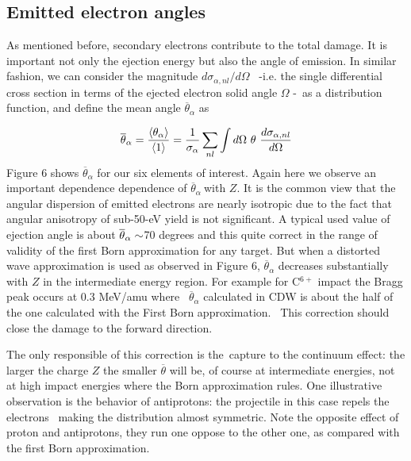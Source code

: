\documentclass[preprint,showpacs,pra]{revtex4-1}
\begin{document}
\subsection{Emitted electron angles}

As mentioned before, secondary electrons contribute to the total damage. It
is important not only the ejection energy but also the angle of emission. In
similar fashion, we can consider the magnitude $d\sigma _{\alpha
,nl}/d\Omega $ \ -i.e. the single differential cross section in terms of the
ejected electron solid angle $\Omega $ -\ as a distribution function, and
define the mean angle $\overline{\theta }_{\alpha }$ as

\begin{equation}
\overline{\theta }_{\alpha }=\frac{\langle \theta _{\alpha }\rangle }{%
\langle 1\rangle }=\frac{1}{\sigma _{\alpha }}\sum\limits_{nl}\int d\Omega
\ \theta \ \frac{d\sigma _{\alpha ,nl}}{d\Omega }
\end{equation}%
Figure 6 shows $\overline{\theta }_{\alpha }$ for our six elements of
interest. Again here we observe an important dependence dependence of $%
\overline{\theta }_{\alpha }\ $with $Z.$ It is the common view 
\cite{Rudd1992} that the angular dispersion of emitted electrons are nearly
isotropic due to the fact that angular anisotropy of sub-50-eV yield is not
significant. A typical used value of ejection angle is about $\overline{%
\theta }_{\alpha }\sim $70 degrees \cite{surdutovic2018} and this quite
correct in the range of validity of the first Born approximation for any
target. But when a distorted wave approximation is used as observed in
Figure 6, $\overline{\theta }_{\alpha }$ decreases substantially with $Z$ in
the intermediate energy region. For example for C$^{6+}$ impact the Bragg
peak occurs at 0.3 MeV/amu where \ $\overline{\theta }_{\alpha }$ calculated
in CDW is about the half of the one calculated with the First Born
approximation. \ This correction should close the damage to the forward
direction.

The only responsible of this correction is the\ capture to the continuum
effect: the larger the charge $Z$ the smaller $\overline{\theta }$ will be,
of course at intermediate energies, not at high impact energies where the
Born approximation rules. One illustrative observation is the behavior of
antiprotons: the projectile in this case repels the electrons \ making the
distribution almost symmetric. Note the opposite effect of proton and
antiprotons, they run one oppose to the other one, as compared with the
first Born approximation.
\end{document}
